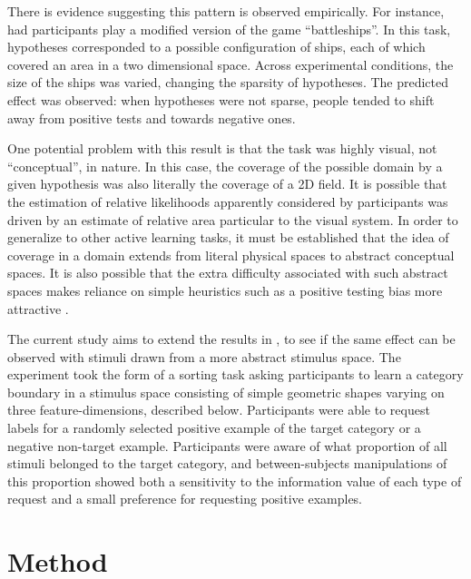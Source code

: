 \documentclass[10pt,letterpaper]{article}
\begin{document}
There is evidence suggesting this pattern is observed empirically. For instance,   had participants play a modified version of the game ``battleships''. In this task, hypotheses corresponded to a possible configuration of ships, each of which covered an area in a two dimensional space. Across experimental conditions, the size of the ships was varied, changing the sparsity of hypotheses. The predicted effect was observed: when hypotheses were not sparse, people tended to shift away from positive tests and towards negative ones. 

One potential problem with this result is that the task was highly visual, not ``conceptual'', in nature. In this case, the coverage of the possible domain by a given hypothesis was also literally the coverage of a 2D field. It is possible that the estimation of relative likelihoods apparently considered by participants was driven by an estimate of relative area particular to the visual system. In order to generalize to other active learning tasks, it must be established that the idea of coverage in a domain extends from literal physical spaces to abstract conceptual spaces. It is also possible that the extra difficulty associated with such abstract spaces makes reliance on simple heuristics such as a positive testing bias more attractive \cite{cherubini2010questionasymmetry}.

The current study aims to extend the results in , to see if the same effect can be observed with stimuli drawn from a more abstract stimulus space. The experiment took the form of a sorting task asking participants to learn a category boundary in a stimulus space consisting of simple geometric shapes varying on three feature-dimensions, described below. Participants were able to request labels for a randomly selected positive example of the target category or a negative non-target example. Participants were aware of what proportion of all stimuli belonged to the target category, and between-subjects manipulations of this proportion showed both a sensitivity to the information value of each type of request and a small preference for requesting positive examples.

\section*{Method}
\end{document}
